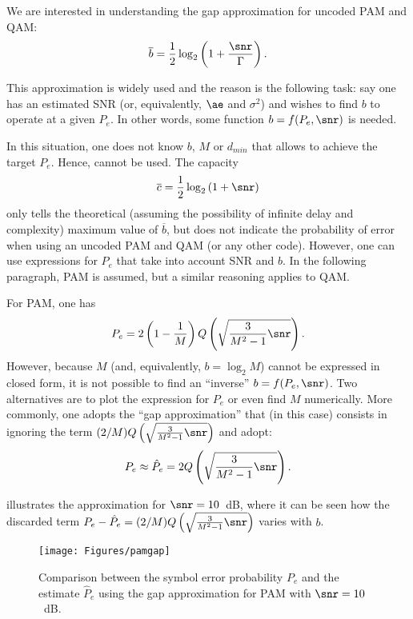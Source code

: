 We are interested in understanding the gap approximation for uncoded PAM and QAM:
\begin{equation}
\overline{b} = \frac 1 2 \log_2 \left(1 + \frac{\snr}{\Gamma} \right).
\label{eq:gap_both_pam_qam}
\end{equation}

This approximation is widely used and the reason is the following task: say one has an estimated SNR (or, equivalently, $\ae$ and $\sigma^2$) and wishes to find $b$ to operate at a given $P_e$. 
In other words, some function $b = f(P_e, \snr)$ is needed. 

In this situation, one does not know $b$, $M$ or $d_{min}$ that allows to achieve the target $P_e$. Hence,  cannot be used. The capacity 
\[
\overline{c} = \frac 1 2 \log_2 \left(1 + \snr \right)
\]
only tells the theoretical (assuming the possibility of infinite delay and complexity) maximum value of $\overline b$, but does not indicate the probability of error when using an uncoded PAM and QAM (or any other code).
However, one can use expressions for $P_e$ that take into account SNR and $b$. In the following paragraph, PAM is assumed, but a similar reasoning applies to QAM.

For PAM, one has
	$$P_e = 2 \left(1 - \frac 1 M\right) Q \left( \sqrt{\frac{3}{M^2-1} \snr}  \right).$$
However, because $M$ (and, equivalently, $b=\log_2 M$) cannot be expressed in closed form, 
it is not possible to find an ``inverse'' $b = f(P_e, \snr)$.
Two alternatives are to plot the expression for $P_e$ or even find $M$ numerically. More commonly, one adopts the ``gap approximation'' that (in this case) consists in ignoring the term $(2/M) Q \left( \sqrt{\frac{3}{M^2-1} \snr}  \right)$ and adopt: %
\begin{equation}
{P}_e \approx \hat P_e = 2 Q \left( \sqrt{\frac{3}{M^2-1}\snr}  \right).
\label{eq:pe_pam_gap}
\end{equation}

 illustrates the approximation for $\snr=10$~dB, where it can be seen how the discarded term $P_e - \hat P_e = (2/M) Q \left( \sqrt{\frac{3}{M^2-1} \snr}  \right)$ varies with $b$.

\begin{figure}[htbp]
\centering
\texttt{[image: Figures/pamgap]}
\caption{Comparison between the symbol error probability $P_e$ and the estimate $\hat P_e$ using the gap approximation for PAM with $\snr = 10$~dB.\label{fig:pamgap}}
\end{figure}

